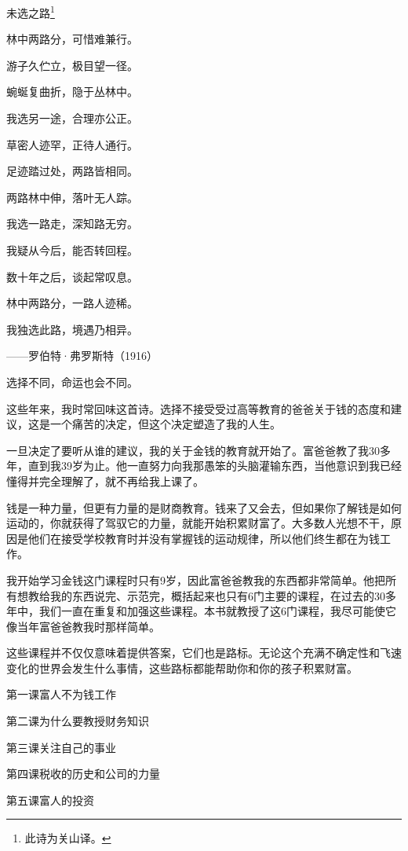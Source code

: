 \begin{center}{\kaishu
未选之路\footnote{此诗为关山译。}

林中两路分，可惜难兼行。

游子久伫立，极目望一径。

蜿蜒复曲折，隐于丛林中。

我选另一途，合理亦公正。

草密人迹罕，正待人通行。

足迹踏过处，两路皆相同。

两路林中伸，落叶无人踪。

我选一路走，深知路无穷。

我疑从今后，能否转回程。

数十年之后，谈起常叹息。

林中两路分，一路人迹稀。

我独选此路，境遇乃相异。

\hfill ——罗伯特·弗罗斯特（1916）}
\end{center}

选择不同，命运也会不同。

这些年来，我时常回味这首诗。选择不接受受过高等教育的爸爸关于钱的态度和建议，这是一个痛苦的决定，但这个决定塑造了我的人生。

一旦决定了要听从谁的建议，我的关于金钱的教育就开始了。富爸爸教了我30多年，直到我39岁为止。他一直努力向我那愚笨的头脑灌输东西，当他意识到我已经懂得并完全理解了，就不再给我上课了。

钱是一种力量，但更有力量的是财商教育。钱来了又会去，但如果你了解钱是如何运动的，你就获得了驾驭它的力量，就能开始积累财富了。大多数人光想不干，原因是他们在接受学校教育时并没有掌握钱的运动规律，所以他们终生都在为钱工作。

我开始学习金钱这门课程时只有9岁，因此富爸爸教我的东西都非常简单。他把所有想教给我的东西说完、示范完，概括起来也只有6门主要的课程，在过去的30多年中，我们一直在重复和加强这些课程。本书就教授了这6门课程，我尽可能使它像当年富爸爸教我时那样简单。

这些课程并不仅仅意味着提供答案，它们也是路标。无论这个充满不确定性和飞速变化的世界会发生什么事情，这些路标都能帮助你和你的孩子积累财富。

{\fangsong
第一课\q 富人不为钱工作

第二课\q 为什么要教授财务知识

第三课\q 关注自己的事业

第四课\q 税收的历史和公司的力量

第五课\q 富人的投资}
